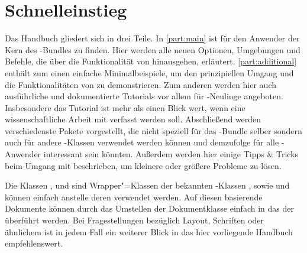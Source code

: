 \section{Schnelleinstieg}
Das Handbuch gliedert sich in drei Teile. In \autoref{part:main} ist für den 
Anwender der Kern des \TUDScript-Bundles zu finden. Hier werden alle neuen 
Optionen, Umgebungen und Befehle, die über die Funktionalität von \KOMAScript{} 
hinausgehen, erläutert. \autoref{part:additional} enthält zum einen einfache 
Minimalbeispiele, um den prinzipiellen Umgang und die Funktionalitäten von 
\TUDScript zu demonstrieren. Zum anderen werden hier auch ausführliche und 
dokumentierte Tutorials vor allem für -Neulinge angeboten. 
Insbesondere das Tutorial  ist mehr als einen Blick wert, 
wenn eine wissenschaftliche Arbeit mit  verfasst werden soll.
Abschließend werden verschiedenste Pakete vorgestellt, die nicht speziell für 
das \TUDScript-Bundle selber sondern auch für andere -Klassen
verwendet werden können und demzufolge für alle -Anwender 
interessant sein könnten. Außerdem werden hier einige Tipps \& Tricks beim 
Umgang mit  beschrieben, um kleinere oder größere Probleme zu 
lösen.

Die Klassen ,  und  
sind Wrapper"=Klassen der bekannten \KOMAScript-Klassen , 
 sowie  und können einfach anstelle deren 
verwendet werden. Auf diesen basierende Dokumente können durch das Umstellen 
der Dokumentklasse einfach in das \CD der \TnUD überführt werden. Bei 
Fragestellungen bezüglich Layout, Schriften oder ähnlichem ist in jedem Fall 
ein weiterer Blick in das hier vorliegende Handbuch empfehlenswert.